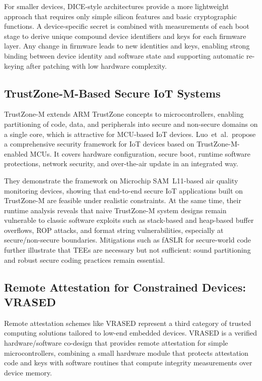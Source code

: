 \documentclass[conference,11pt,a4paper]{IEEEtran}
\begin{document}
For smaller devices, DICE-style architectures provide a more lightweight approach that requires only simple silicon features and basic cryptographic functions. A device-specific secret is combined with measurements of each boot stage to derive unique compound device identifiers and keys for each firmware layer. Any change in firmware leads to new identities and keys, enabling strong binding between device identity and software state and supporting automatic re-keying after patching with low hardware complexity.

\subsection{TrustZone-M-Based Secure IoT Systems}
TrustZone-M extends ARM TrustZone concepts to microcontrollers, enabling partitioning of code, data, and peripherals into secure and non-secure domains on a single core, which is attractive for MCU-based IoT devices.\cite{tzm_runtime} Luo~et~al.\ propose a comprehensive security framework for IoT devices based on TrustZone-M-enabled MCUs. It covers hardware configuration, secure boot, runtime software protections, network security, and over-the-air update in an integrated way.\cite{tzm_framework}

They demonstrate the framework on Microchip SAM~L11-based air quality monitoring devices, showing that end-to-end secure IoT applications built on TrustZone-M are feasible under realistic constraints.\cite{tzm_framework} At the same time, their runtime analysis reveals that naive TrustZone-M system designs remain vulnerable to classic software exploits such as stack-based and heap-based buffer overflows, ROP attacks, and format string vulnerabilities, especially at secure/non-secure boundaries.\cite{tzm_runtime,tzm_framework} Mitigations such as fASLR for secure-world code further illustrate that TEEs are necessary but not sufficient: sound partitioning and robust secure coding practices remain essential.\cite{tee_trustcom}

\subsection{Remote Attestation for Constrained Devices: VRASED}
Remote attestation schemes like VRASED represent a third category of trusted computing solutions tailored to low-end embedded devices. VRASED is a verified hardware/software co-design that provides remote attestation for simple microcontrollers, combining a small hardware module that protects attestation code and keys with software routines that compute integrity measurements over device memory.\cite{vRased_usenix}
\end{document}
